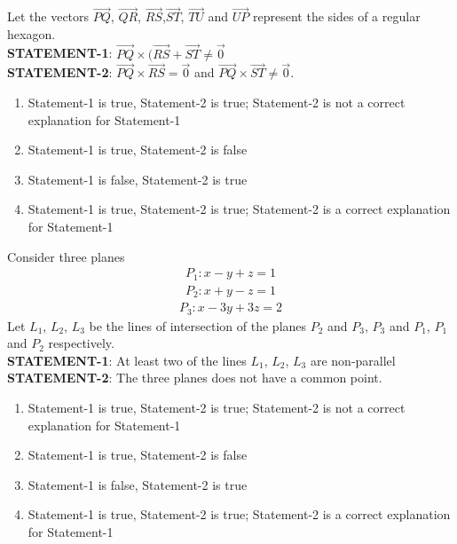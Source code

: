 \item Let the vectors $\overrightarrow{PQ}$, $\overrightarrow{QR}$, $\overrightarrow{RS}$,$\overrightarrow{ST}$, $\overrightarrow{TU}$ and $\overrightarrow{UP}$ represent the sides of a regular hexagon.\\
\textbf{STATEMENT-1}: $\overrightarrow{PQ} \times (\overrightarrow{RS} + \overrightarrow{ST} \neq \overrightarrow{0}$\\
\textbf{STATEMENT-2}: $\overrightarrow{PQ} \times \overrightarrow{RS} = \overrightarrow{0}$ and $\overrightarrow{PQ} \times \overrightarrow{ST} \neq \overrightarrow{0}$.
\begin{enumerate}
\item Statement-1 is true, Statement-2 is true; Statement-2 is not a correct explanation for Statement-1
\item Statement-1 is true, Statement-2 is false
\item Statement-1 is false, Statement-2 is true
\item Statement-1 is true, Statement-2 is true; Statement-2 is a correct explanation for Statement-1
\end{enumerate}

\item Consider three planes
\begin{align*}
P_1: x - y + z = 1
\end{align*}
\begin{align*}
P_2: x + y - z = 1
\end{align*}
\begin{align*}
P_3: x - 3y + 3z = 2
\end{align*}
Let $L_1$, $L_2$, $L_3$ be the lines of intersection of the planes $P_2$ and $P_3$, $P_3$ and $P_1$, $P_1$ and $P_2$ respectively.\\
\textbf{STATEMENT-1}: At least two of the lines $L_1$, $L_2$, $L_3$ are non-parallel\\
\textbf{STATEMENT-2}: The three planes does not have a common point.
\begin{enumerate}
\item Statement-1 is true, Statement-2 is true; Statement-2 is not a correct explanation for Statement-1
\item Statement-1 is true, Statement-2 is false
\item Statement-1 is false, Statement-2 is true
\item Statement-1 is true, Statement-2 is true; Statement-2 is a correct explanation for Statement-1
\end{enumerate}
 
